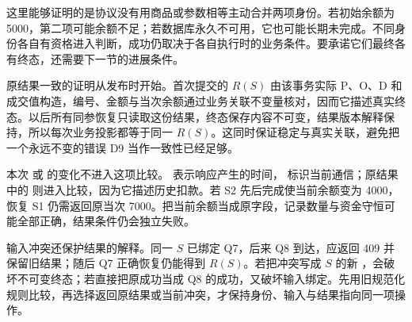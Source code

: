这里能够证明的是协议没有用商品或参数相等主动合并两项身份。若初始余额为 5000，第二项可能余额不足；若数据库永久不可用，它也可能长期未完成。不同身份各自有资格进入判断，成功仍取决于各自执行时的业务条件。要承诺它们最终各有终态，还需要下一节的进展条件。



原结果一致的证明从发布时开始。首次提交的 \(R(S)\) 由该事务实际 P、O、D 和成交值构造，编号、金额与当次余额通过业务关联不变量核对，因而它描述真实终态。以后所有同参恢复只读取这份结果，终态保存内容不可变，结果版本解释保持，所以每次业务投影都等于同一 \(R(S)\)。这同时保证稳定与真实关联，避免把一个永远不变的错误 D9 当作一致性已经足够。

本次  或  的变化不进入这项比较。 表示响应产生的时间， 标识当前通信；原结果中的  则进入比较，因为它描述历史扣款。若 S2 先后完成使当前余额变为 4000，恢复 S1 仍需返回原当次 7000。把当前余额当成原字段，记录数量与资金守恒可能全部正确，结果条件仍会独立失败。

输入冲突还保护结果的解释。同一 \(S\) 已绑定 Q7，后来 Q8 到达，应返回 409 并保留旧结果；随后 Q7 正确恢复仍能得到 \(R(S)\)。若把冲突写成 \(S\) 的新 ，会破坏不可变终态；若直接把原成功当成 Q8 的成功，又破坏输入绑定。先用旧规范化规则比较，再选择返回原结果或当前冲突，才保持身份、输入与结果指向同一项操作。
\FloatBarrier
